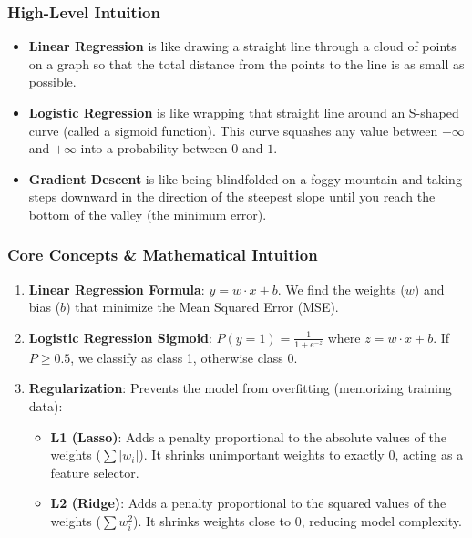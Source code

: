 \subsubsection{High-Level Intuition}\label{high-level-intuition-3}

\begin{itemize}
\tightlist
\item
  \textbf{Linear Regression} is like drawing a straight line through a
  cloud of points on a graph so that the total distance from the points
  to the line is as small as possible.
\item
  \textbf{Logistic Regression} is like wrapping that straight line
  around an S-shaped curve (called a sigmoid function). This curve
  squashes any value between \(-\infty\) and \(+\infty\) into a
  probability between \(0\) and \(1\).
\item
  \textbf{Gradient Descent} is like being blindfolded on a foggy
  mountain and taking steps downward in the direction of the steepest
  slope until you reach the bottom of the valley (the minimum error).
\end{itemize}

\subsubsection{Core Concepts \& Mathematical
Intuition}\label{core-concepts-mathematical-intuition-2}

\begin{enumerate}
\def\labelenumi{\arabic{enumi}.}
\tightlist
\item
  \textbf{Linear Regression Formula}: \(y = w \cdot x + b\). We find the
  weights (\(w\)) and bias (\(b\)) that minimize the Mean Squared Error
  (MSE).
\item
  \textbf{Logistic Regression Sigmoid}:
  \(P(y=1) = \frac{1}{1 + e^{-z}}\) where \(z = w \cdot x + b\). If
  \(P \ge 0.5\), we classify as class 1, otherwise class 0.
\item
  \textbf{Regularization}: Prevents the model from overfitting
  (memorizing training data):

  \begin{itemize}
  \tightlist
  \item
    \textbf{L1 (Lasso)}: Adds a penalty proportional to the absolute
    values of the weights (\(\sum |w_i|\)). It shrinks unimportant
    weights to exactly 0, acting as a feature selector.
  \item
    \textbf{L2 (Ridge)}: Adds a penalty proportional to the squared
    values of the weights (\(\sum w_i^2\)). It shrinks weights close to
    0, reducing model complexity.
  \end{itemize}
\end{enumerate}

